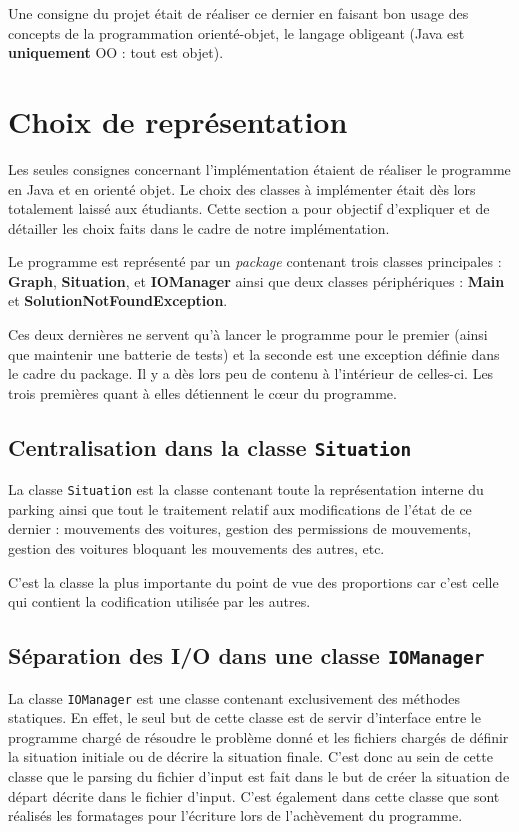 \documentclass{article}
\begin{document}
        Une consigne du projet était de réaliser ce dernier en faisant bon usage des concepts de la programmation orienté-objet, le langage
        obligeant (Java est \textbf{uniquement} OO : tout est objet).

\section{Choix de représentation}
    Les seules consignes concernant l'implémentation étaient de réaliser le programme en Java et en orienté objet. Le choix des classes à implémenter était
    dès lors totalement laissé aux étudiants. Cette section a pour objectif d'expliquer et de détailler les choix faits dans le cadre de notre implémentation.

    Le programme est représenté par un \textit{package} contenant trois classes principales : \textbf{Graph}, \textbf{Situation}, et \textbf{IOManager}
    ainsi que deux classes périphériques : \textbf{Main} et \textbf{SolutionNotFoundException}.

    Ces deux dernières ne servent qu'à lancer le programme pour le premier (ainsi que maintenir une batterie de tests) et la seconde est une exception
    définie dans le cadre du package. Il y a dès lors peu de contenu à l'intérieur de celles-ci. Les trois premières quant à elles détiennent le cœur du
    programme.

    \subsection{Centralisation dans la classe \texttt{Situation}}
        La classe \texttt{Situation} est la classe contenant toute la représentation interne du parking ainsi que tout le traitement relatif aux
        modifications de l'état de ce dernier : mouvements des voitures, gestion des permissions de mouvements, gestion des voitures bloquant
        les mouvements des autres, etc.

        C'est la classe la plus importante du point de vue des proportions car c'est celle qui contient la codification utilisée par les autres.

    \subsection{Séparation des I/O dans une classe \texttt{IOManager}}
        La classe \texttt{IOManager} est une classe contenant exclusivement des méthodes statiques. En effet, le seul but de cette classe
        est de servir d'interface entre le programme chargé de résoudre le problème donné et les fichiers chargés de définir la situation
        initiale ou de décrire la situation finale. C'est donc au sein de cette classe que le parsing du fichier d'input est fait dans le but
        de créer la situation de départ décrite dans le fichier d'input. C'est également dans cette classe que sont réalisés les formatages
        pour l'écriture lors de l'achèvement du programme.
\end{document}
